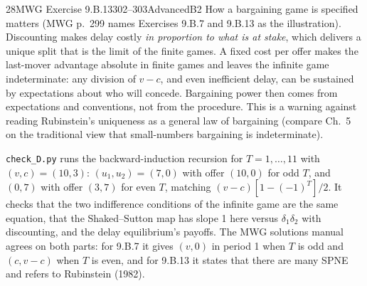 \begin{exsol}{28}{MWG Exercise 9.B.13}{302--303}{Advanced}{B2}
\interp How a bargaining game is specified matters (MWG p.~299 names Exercises 9.B.7 and 9.B.13
as the illustration). Discounting makes delay costly \emph{in proportion to what is at stake},
which delivers a unique split that is the limit of the finite games. A fixed cost per offer
makes the last-mover advantage absolute in finite games and leaves the infinite game
indeterminate: any division of $v - c$, and even inefficient delay, can be sustained by
expectations about who will concede. Bargaining power then comes from expectations and
conventions, not from the procedure. This is a warning against reading Rubinstein's uniqueness
as a general law of bargaining (compare \MR{} Ch.~5 on the traditional view that small-numbers
bargaining is indeterminate).

\verify \texttt{check\_D.py} runs the backward-induction recursion for $T = 1, \dots, 11$ with
$(v, c) = (10, 3)$: $(u_1, u_2) = (7, 0)$ with offer $(10, 0)$ for odd $T$, and $(0, 7)$ with
offer $(3, 7)$ for even $T$, matching $(v-c)[1 - (-1)^T]/2$. It checks that the two indifference
conditions of the infinite game are the same equation, that the Shaked--Sutton map has slope 1
here versus $\delta_1\delta_2$ with discounting, and the delay equilibrium's payoffs. The MWG
solutions manual agrees on both parts: for 9.B.7 it gives $(v, 0)$ in period 1 when $T$ is odd and
$(c, v - c)$ when $T$ is even, and for 9.B.13 it states that there are many SPNE and refers to
Rubinstein (1982).

\end{exsol}
